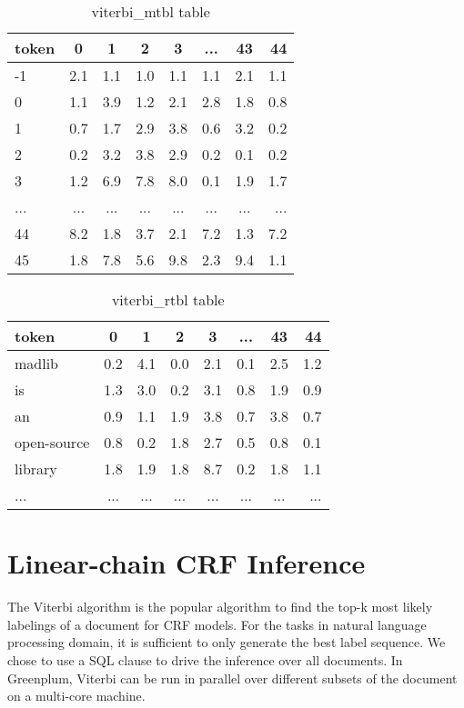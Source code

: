 \begin{itemize}
\begin {table}[h]
\caption {viterbi\_mtbl table} \label{tab:viterbimtbl}
 \begin{center}
  \begin{tabular}{l*{6}{c}r}
   token             & 0   & 1   & 2   & 3   & ... & 43 &  44 \\
   \hline
  -1                 & 2.1 & 1.1 & 1.0 & 1.1 & 1.1 & 2.1 & 1.1  \\
   0                 & 1.1 & 3.9 & 1.2 & 2.1 & 2.8 & 1.8 & 0.8  \\
   1                 & 0.7 & 1.7 & 2.9 & 3.8 & 0.6 & 3.2 & 0.2  \\
   2                 & 0.2 & 3.2 & 3.8 & 2.9 & 0.2 & 0.1 & 0.2  \\
   3                 & 1.2 & 6.9 & 7.8 & 8.0 & 0.1 & 1.9 & 1.7  \\
   ...               & ... & ... & ... & ... & ... & ... & ...  \\
   44                & 8.2 & 1.8 & 3.7 & 2.1 & 7.2 & 1.3 & 7.2  \\
   45                & 1.8 & 7.8 & 5.6 & 9.8 & 2.3 & 9.4 & 1.1
  \end{tabular}
 \end{center}
\end{table}
\begin {table}[h]
\caption {viterbi\_rtbl table} \label{tab:viterbirtbl}
 \begin{center}
  \begin{tabular}{l*{6}{c}r}
   token             & 0   & 1   & 2   & 3   & ... & 43 &  44 \\
   \hline
   madlib            & 0.2 & 4.1 & 0.0 & 2.1 & 0.1 & 2.5 & 1.2  \\
   is                & 1.3 & 3.0 & 0.2 & 3.1 & 0.8 & 1.9 & 0.9  \\
   an                & 0.9 & 1.1 & 1.9 & 3.8 & 0.7 & 3.8 & 0.7  \\
   open-source       & 0.8 & 0.2 & 1.8 & 2.7 & 0.5 & 0.8 & 0.1  \\
   library           & 1.8 & 1.9 & 1.8 & 8.7 & 0.2 & 1.8 & 1.1  \\
   ...               & ... & ... & ... & ... & ... & ... & ...  \\
  \end{tabular}
 \end{center}
\end{table}
\end{itemize}

\section{Linear-chain CRF Inference}
The Viterbi algorithm \cite{DBLP:journals/scholarpedia/Viterbi09} is the popular algorithm to find the top-k most likely labelings of a document for CRF models.
For the tasks in natural language processing domain, it is sufficient to only generate the best label sequence.
We chose to use a SQL clause to drive the inference over all documents.
In Greenplum, Viterbi can be run in parallel over different subsets of the document on a multi-core machine.

